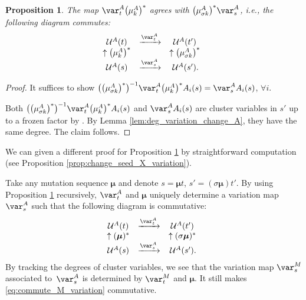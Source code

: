 \documentclass[pdftex]{sigma}
\newcommand{\upClAlg}{\mathcal{U}^A}
\newcommand{\seq}{\boldsymbol{\mu}}%
\numberwithin{equation}{section}
\newtheorem{Proposition}[Theorem]{Proposition}
 { \theoremstyle{definition}
\newtheorem{Definition}[Theorem]{Definition}
\newtheorem{Note}[Theorem]{Note}
\newtheorem{Example}[Theorem]{Example}
\newtheorem{Remark}[Theorem]{Remark}
\newtheorem{Assumption}[Theorem]{Assumption}
}
\begin{document}
\begin{Proposition}\label{prop:change_seed_A_variation}
The map $\var_{t}^{A}\big(\mu_{k}^{A}\big)^{*}$ agrees with $\big(\mu_{\sigma k}^{A}\big)^{*}\var_{s}^{A}$,
i.e., the following diagram commutes:
\begin{align*}%
\begin{array}{@{}ccc}
 \upClAlg(t) & \xrightarrow{\var_{t}^{A}} & \upClAlg(t')\\
\uparrow\big(\mu_{k}^{A}\big)^{*} & & \uparrow\big(\mu_{\sigma k}^{A}\big)^{*}\\
\upClAlg(s) & \xrightarrow{\var_{s}^{A}} &\,\upClAlg(s').
\end{array}
\end{align*}
\end{Proposition}

\begin{proof}
It suffices to show $\big(\big(\mu_{\sigma k}^{A}\big)^{*}\big)^{-1}\var_{t}^{A}\big(\mu_{k}^{A}\big)^{*}A_{i}(s)=\var_{s}^{A}A_{i}(s)$, $\forall i$.

Both $\big(\big(\mu_{\sigma k}^{A}\big)^{*}\big)^{-1}\var_{t}^{A}\big(\mu_{k}^{A}\big)^{*}A_{i}(s)$
and $\var_{s}^{A}A_{i}(s)$ are cluster variables in $s'$ up to a
frozen factor by \cite[Lemma 4.2.2]{qin2017triangular}. By Lemma
\ref{lem:deg_variation_change_A}, they have the same degree.
The claim follows.
\end{proof}

We can given a different proof for Proposition \ref{prop:change_seed_A_variation}
by straightforward computation (see Proposition \ref{prop:change_seed_X_variation}).

Take any mutation sequence $\seq$ and denote $s=\seq t$, $s'=(\sigma\seq)t'$.
By using Proposition \ref{prop:change_seed_A_variation} recursively,
$\var_{t}^{A}$ and $\seq$ uniquely determine a variation map $\var_{s}^{A}$
such that the following diagram is commutative:
\begin{align*}
\begin{array}{@{}ccc}
\upClAlg(t) & \xrightarrow{\var_{t}^{A}} & \upClAlg(t')\\
\uparrow(\seq)^{*} & & \uparrow(\sigma\seq)^{*}\\
\upClAlg(s) & \xrightarrow{\var_{s}^{A}} & \,\upClAlg(s').
\end{array}%
\end{align*}
By tracking the degrees of cluster variables, we see that the variation
map $\var_{s}^{M}$ associated to~$\var_{s}^{A}$ is determined
by $\var_{t}^{M}$ and $\seq$. It still makes \eqref{eq:commute_M_variation}
commutative.
\end{document}
